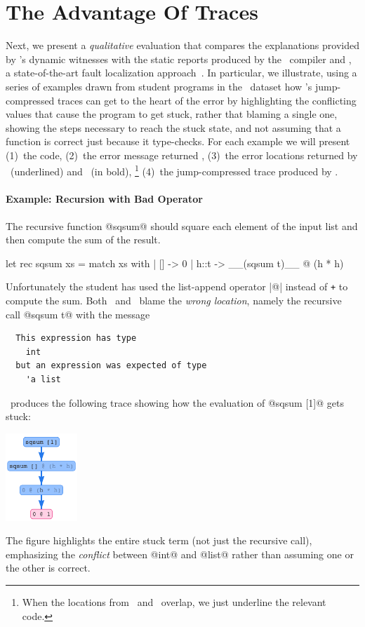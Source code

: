 \section{The Advantage Of Traces}\label{sec:advantage-traces}

Next, we present a \emph{qualitative} evaluation that compares
the explanations provided by \toolname's dynamic witnesses with
the static reports produced by the \ocaml\ compiler and \sherrloc,
a state-of-the-art fault localization approach~\cite{ZhangMyers}.
%
In particular, we illustrate, using a series of examples drawn
from student programs in the \ucsdbench\ dataset how \toolname's
jump-compressed traces can get to the heart of the error by
%
highlighting the conflicting values that cause the program to get
stuck, rather that blaming a single one,
%
showing the steps necessary to reach the stuck state, and
%
not assuming that a function is correct just because it type-checks.
%
For each example we will present
(1)~the code,
(2)~the error message returned \ocaml,
(3)~the error locations returned by \ocaml\ (underlined) and \sherrloc\ (in bold),
\footnote{When the locations from \ocaml\ and \sherrloc\ overlap,
we just underline the relevant code.}
(4)~the jump-compressed trace produced by \toolname.



\paragraph{Example: Recursion with Bad Operator}
The recursive function @sqsum@ should square each
element of the input list and then compute the sum
of the result.
%
\begin{ecode}
  let rec sqsum xs = match xs with
    | [] -> 0
    | h::t -> __(sqsum t)__ @ (h * h)
\end{ecode}
%
Unfortunately the student has used the list-append
operator |@| instead of \texttt{+} to compute the sum.
%
Both \ocaml\ and \sherrloc\ blame the \emph{wrong location},
namely the recursive call @sqsum t@ with the message
%
\begin{verbatim}
  This expression has type
    int
  but an expression was expected of type
    'a list
\end{verbatim}
%
\toolname\ produces the following trace showing how the evaluation of
@sqsum [1]@ gets stuck:
%
\begin{center}
  \includegraphics[height=125px]{sqsum.png}
\end{center}
%
The figure highlights the entire stuck term
(not just the recursive call), emphasizing
the \emph{conflict} between @int@ and @list@
rather than assuming one or the other is correct.

